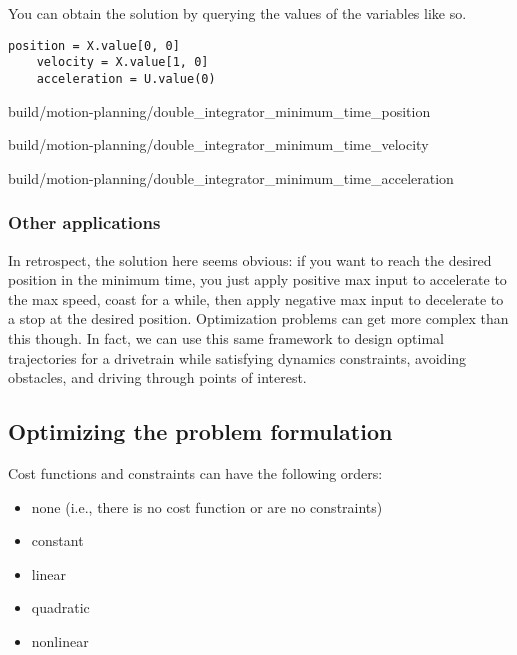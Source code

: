 You can obtain the solution by querying the values of the variables like so.
\begin{code}
  \begin{lstlisting}[style=customPython]
    position = X.value[0, 0]
    velocity = X.value[1, 0]
    acceleration = U.value(0)
  \end{lstlisting}
\end{code}
\begin{bookfigure}
  \begin{minisvg}{2}{build/motion-planning/double_integrator_minimum_time_position}
    \caption{Double integrator position}
  \end{minisvg}
  \hfill
  \begin{minisvg}{2}{build/motion-planning/double_integrator_minimum_time_velocity}
    \caption{Double integrator velocity}
  \end{minisvg}
  \hfill
  \begin{minisvg}{2}{build/motion-planning/double_integrator_minimum_time_acceleration}
    \caption{Double integrator acceleration}
  \end{minisvg}
\end{bookfigure}

\subsubsection{Other applications}

In retrospect, the solution here seems obvious: if you want to reach the desired
position in the minimum time, you just apply positive max input to accelerate to
the max speed, coast for a while, then apply negative max input to decelerate to
a stop at the desired position. Optimization problems can get more complex than
this though. In fact, we can use this same framework to design optimal
trajectories for a drivetrain while satisfying dynamics constraints, avoiding
obstacles, and driving through points of interest.

\subsection{Optimizing the problem formulation}

Cost functions and constraints can have the following orders:
\begin{itemize}
  \item none (i.e., there is no cost function or are no constraints)
  \item constant
  \item linear
  \item quadratic
  \item nonlinear
\end{itemize}

